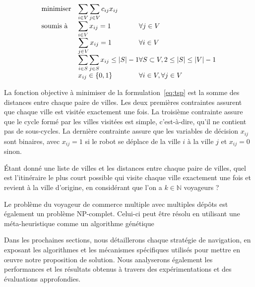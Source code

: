 \documentclass[francais,RandD]{rapportPFE}
\begin{document}
				\begin{equation}
					\label{eq:tsp}
					\begin{array}{ll@{}ll}
						\text{minimiser}  & \displaystyle\sum\limits_{i \in V} \sum\limits_{j \in V} c_{ij} x_{ij} \\
						\text{soumis à}   & \displaystyle\sum\limits_{i \in V} x_{ij} = 1 & \forall j \in V\\
						& \displaystyle\sum\limits_{j \in V} x_{ij} = 1 & \forall i \in V\\
						& \displaystyle\sum\limits_{i \in S} \sum\limits_{j \in S} x_{ij} \leq |S| - 1 & \forall S \subset V, 2 \leq |S| \leq |V| - 1\\
						& x_{ij} \in \{0, 1\} & \forall i \in V, \forall j \in V\\
					\end{array}
				\end{equation}

				La fonction objective à minimiser de la formulation~\ref{eq:tsp} est la somme des distances entre chaque paire de villes.
				Les deux premières contraintes assurent que chaque ville est visitée exactement une fois.
				La troisième contrainte assure que le cycle formé par les villes visitées est simple, c'est-à-dire, qu'il ne contient pas de sous-cycles.
				La dernière contrainte assure que les variables de décision $x_{ij}$ sont binaires, avec $x_{ij} = 1$ si le robot se déplace de la ville $i$ à la ville $j$ et $x_{ij} = 0$ sinon.

				\begin{Definition}
					\label{def:mtsp}
					Étant donné une liste de villes et les distances entre chaque paire de villes, quel est l'itinéraire le plus court possible qui visite chaque ville exactement une fois et revient à la ville d'origine, en considérant que l'on a $k \in \mathbb{N}$ voyageurs ?
				\end{Definition}

				Le problème du voyageur de commerce multiple avec multiples dépôts est également un problème NP-complet.
				Celui-ci peut être résolu en utilisant une méta-heuristique comme un algorithme génétique~\cite{SinghMTSP, Kiraly2011}

				Dans les prochaines sections, nous détaillerons chaque stratégie de navigation, en exposant les algorithmes et les mécanismes spécifiques utilisés pour mettre en œuvre notre proposition de solution. Nous analyserons également les performances et les résultats obtenus à travers des expérimentations et des évaluations approfondies.
\end{document}
